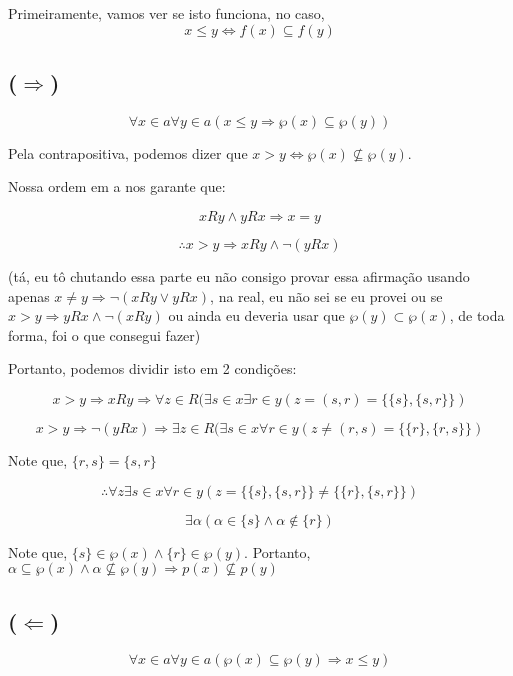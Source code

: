 \documentclass[12pt]{extarticle}
\begin{document}
Primeiramente, vamos ver se isto funciona, no caso, $$x \leq y \Leftrightarrow f(x) \subseteq f(y)$$

\subsection{($\Rightarrow$)}

\begin{equation}
    \forall x \in a \forall y \in a (x \leq y \Rightarrow \wp (x) \subseteq \wp (y))
\end{equation}

Pela contrapositiva, podemos dizer que $x > y \Leftrightarrow \wp(x) \nsubseteq \wp(y)$.

Nossa ordem em a nos garante que:

$$
xRy \land yRx \Rightarrow x=y
$$

$$
\therefore x > y \Rightarrow xRy \land \neg (yRx)
$$

(tá, eu tô chutando essa parte eu não consigo provar essa afirmação usando apenas $x \neq y \Rightarrow \neg(xRy \lor yRx)$, na real, eu não sei se eu provei ou se $x>y \Rightarrow yRx \land \neg(xRy)$ ou ainda eu deveria usar que $\wp (y) \subset \wp(x)$, de toda forma, foi o que consegui fazer)

Portanto, podemos dividir isto em 2 condições:

$$
    x > y \Rightarrow xRy \Rightarrow \forall z \in R (\exists s \in x \exists r \in y (z = (s,r) = \{\{s\},\{s,r\}\})
$$


$$
     x > y \Rightarrow \neg(yRx) \Rightarrow \exists z \in R (\exists s \in x \forall r \in y (z \neq (r,s) = \{\{r\},\{r,s\}\})
$$

Note que, $\{r,s\} = \{s,r\}$

$$
\therefore \forall z \exists s \in x \forall r \in y (z = \{\{s\},\{s,r\}\} \neq \{\{r\},\{s,r\}\})
$$

$$
\exists \alpha (\alpha \in \{s\} \land \alpha \notin \{r\})
$$

Note que, $\{s\} \in \wp (x) \land \{r\} \in \wp (y)$. Portanto, $\alpha \subseteq \wp(x) \land \alpha \nsubseteq \wp(y) \Rightarrow p(x) \nsubseteq p(y)$

\subsection{($\Leftarrow$)}

\begin{equation}
    \forall x \in a \forall y \in a (\wp (x) \subseteq \wp (y) \Rightarrow  x \leq y)
\end{equation}
\end{document}
